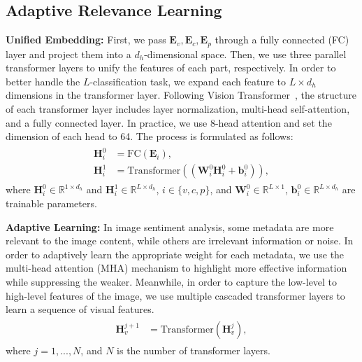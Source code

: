 \subsection{Adaptive Relevance Learning}
\textbf{Unified Embedding:}
First, we pass $\bm{E}_v, \bm{E}_c, \bm{E}_p$ through a fully connected (FC) layer and project them into a $d_h$-dimensional space.
% 
Then, we use three parallel transformer layers to unify the features of each part, respectively.
In order to better handle the $L$-classification task, we expand each feature to $L \times d_h$ dimensions in the transformer layer. Following Vision Transformer~\cite{dosovitskiy2020image}, the structure of each transformer layer includes layer normalization, multi-head self-attention, and a fully connected layer. In practice, we use 8-head attention and set the dimension of each head to 64. The process is formulated as follows:
\begin{eqnarray}
\begin{aligned}
    \bm{H}_i^0 &= \text{FC}(\bm{E}_i),\\
    \bm{H}_i^1 &= \text{Transformer}(({\bm{W}_i^0}{\bm{H}_i^0} + {\bm{b}_i^0})),
\end{aligned}
\end{eqnarray}
% 
where $\bm{H}_i^0 \in \mathbb{R}^{1 \times d_h}$ and $\bm{H}_i^1 \in \mathbb{R}^{L \times d_h}$, $i \in \{ v, c, p \}$, and $\bm{W}_i^0 \in \mathbb{R}^{L \times 1} $, $\bm{b}_i^0 \in \mathbb{R}^{L \times d_h} $ are trainable parameters.

% 
\textbf{Adaptive Learning:}
In image sentiment analysis, some metadata are more relevant to the image content, while others are irrelevant information or noise. In order to adaptively learn the appropriate weight for each metadata, we use the 
multi-head attention (MHA) mechanism
to highlight more effective information while suppressing the weaker.
Meanwhile, in order to capture the low-level to high-level features of the image, we use multiple cascaded transformer layers to learn a sequence of visual features. 
\begin{eqnarray}
\begin{aligned}
    \bm{H}_v^{j+1} &= \text{Transformer}(\bm{H}_v^{j}),
\end{aligned}
\end{eqnarray}
where $j = 1, ..., N$, and $N$ is the number of transformer layers.

